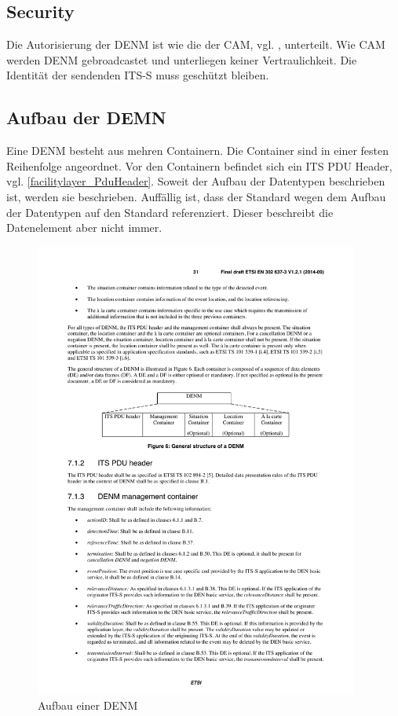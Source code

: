 \subsection{Security}
Die Autorisierung der \ac{DENM} ist wie die der \ac{CAM}, vgl. \label{facilitylayer_CAM-Security}, unterteilt. Wie \ac{CAM} werden \ac{DENM} gebroadcastet und unterliegen keiner Vertraulichkeit. Die Identität der sendenden \ac{ITS-S} muss geschützt bleiben.

\subsection{Aufbau der DEMN}
Eine \ac{DENM} besteht aus mehren Containern. Die Container sind in einer festen Reihenfolge angeordnet.  Vor den Containern befindet sich ein \ac{ITS} PDU Header, vgl. \autoref{facilitylayer_PduHeader}. Soweit der Aufbau der Datentypen beschrieben ist, werden sie beschrieben. Auffällig ist, dass der Standard \cite{en302637-3} wegen dem Aufbau der Datentypen auf den Standard \cite{ts102894-2} referenziert. Dieser beschreibt die Datenelement aber nicht immer.

\begin{figure}[htbp]
	\includegraphics[width=0.95\textwidth]{content/images/04_facilitylayer/denmAufbau.pdf}
	\caption{Aufbau einer DENM \cite{en302637-3}}
	\label{fig:darstellungdenmAufbau}
\end{figure}

